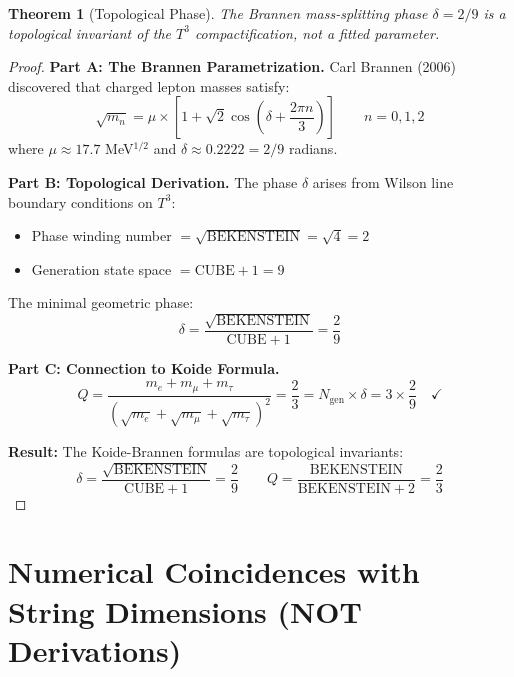 \documentclass[11pt,a4paper]{article}
\theoremstyle{plain}
\newtheorem{theorem}{Theorem}[section]
\theoremstyle{definition}
\theoremstyle{remark}
\newcommand{\Ngen}{N_{\text{gen}}}
\newcommand{\CUBE}{\text{CUBE}}
\newcommand{\BEK}{\text{BEKENSTEIN}}
\begin{document}
\begin{theorem}[Topological Phase]
The Brannen mass-splitting phase $\delta = 2/9$ is a topological invariant of the $T^3$ compactification, not a fitted parameter.
\end{theorem}

\begin{proof}
\textbf{Part A: The Brannen Parametrization.} Carl Brannen (2006) discovered that charged lepton masses satisfy:
\[
\sqrt{m_n} = \mu \times \left[1 + \sqrt{2}\cos\left(\delta + \frac{2\pi n}{3}\right)\right] \qquad n = 0, 1, 2
\]
where $\mu \approx 17.7$ MeV$^{1/2}$ and $\delta \approx 0.2222 = 2/9$ radians.

\textbf{Part B: Topological Derivation.} The phase $\delta$ arises from Wilson line boundary conditions on $T^3$:
\begin{itemize}
  \item Phase winding number $= \sqrt{\BEK} = \sqrt{4} = 2$
  \item Generation state space $= \CUBE + 1 = 9$
\end{itemize}

The minimal geometric phase:
\[
\boxed{\delta = \frac{\sqrt{\BEK}}{\CUBE + 1} = \frac{2}{9}}
\]

\textbf{Part C: Connection to Koide Formula.}
\[
Q = \frac{m_e + m_\mu + m_\tau}{(\sqrt{m_e} + \sqrt{m_\mu} + \sqrt{m_\tau})^2} = \frac{2}{3} = \Ngen \times \delta = 3 \times \frac{2}{9} \quad \checkmark
\]

\textbf{Result:} The Koide-Brannen formulas are topological invariants:
\[
\delta = \frac{\sqrt{\BEK}}{\CUBE + 1} = \frac{2}{9} \qquad Q = \frac{\BEK}{\BEK + 2} = \frac{2}{3}
\]
\end{proof}


\section{Numerical Coincidences with String Dimensions (NOT Derivations)}
\end{document}
